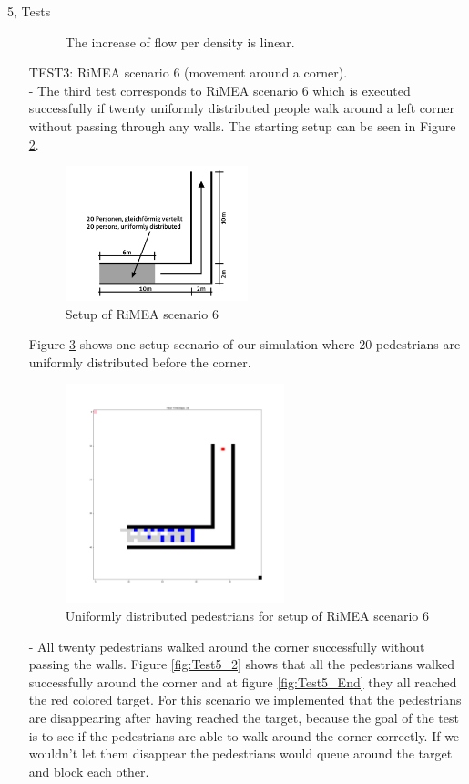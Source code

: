 \documentclass[10pt,a4paper]{article}
\begin{document}
\begin{task}{5, Tests}
\begin{enumerate}
\begin{figure}[H]
    \caption{The increase of flow per density is linear.}
    \label{fig:test2_result}
\end{figure}
\newpage
\item[TEST3:] RiMEA scenario 6 (movement around a corner).\\
- The third test corresponds to RiMEA scenario 6 which is executed successfully if twenty uniformly distributed people walk around a left corner without passing through any walls. The starting setup can be seen in Figure \ref{fig:corner}.
\begin{figure}[H]
    \centering
    \includegraphics[width=0.5\textwidth]{pictures/corner.png}
    \caption{Setup of RiMEA scenario 6}
    \label{fig:corner}
\end{figure}
Figure \ref{fig:test5_1} shows one setup scenario of our simulation where 20 pedestrians are uniformly distributed before the corner.\\
\begin{figure}[H]
    \centering
    \includegraphics[width=0.6\textwidth]{pictures/Test5.png}
    \caption{Uniformly distributed pedestrians for setup of RiMEA scenario 6}
    \label{fig:test5_1}
\end{figure}
- All twenty pedestrians walked around the corner successfully without passing the walls. Figure \ref{fig:Test5_2} shows that all the pedestrians walked successfully around the corner and at figure \ref{fig:Test5_End} they all reached the red colored target. For this scenario we implemented that the pedestrians are disappearing after having reached the target, because the goal of the test is to see if the pedestrians are able to walk around the corner correctly. If we wouldn't let them disappear the pedestrians would queue around the target and block each other.

\end{enumerate}
\end{task}
\end{document}
